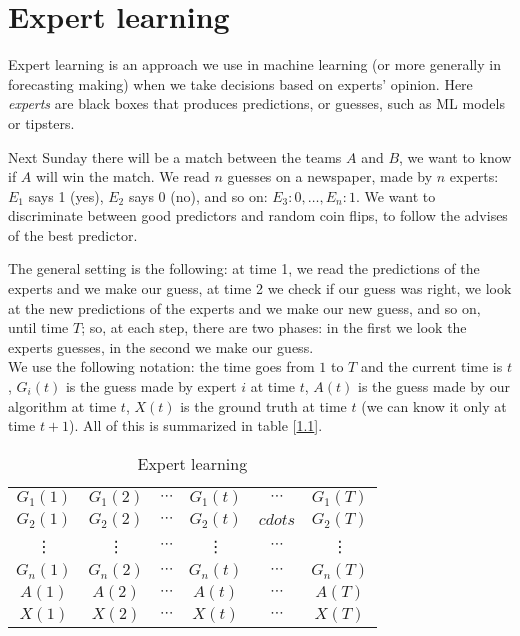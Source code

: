 \chapter{Expert learning}\label{sec:experts}

Expert learning is an approach we use in machine learning (or more generally in forecasting making) when we take decisions based on experts' opinion. Here \textit{experts} are black boxes that produces predictions, or guesses, such as ML models or tipsters.

\begin{ex}
    Next Sunday there will be a match between the teams $A$ and $B$, we want to know if $A$ will win the match. We read $n$ guesses on a newspaper, made by $n$ experts: $E_1$ says 1 (yes), $E_2$ says 0 (no), and so on: $E_3: 0, \ldots, E_n:1$. We want to discriminate between good predictors and random coin flips, to follow the advises of the best predictor.
\end{ex}

The general setting is the following: at time 1, we read the predictions of the experts and we make our guess, at time 2 we check if our guess was right, we look at the new predictions of the experts and we make our new guess, and so on, until time $T$; so, at each step, there are two phases: in the first we look the experts guesses, in the second we make our guess.\\
We use the following notation: the time goes from $1$ to $T$ and the current time is $t$, $G_i(t)$ is the guess made by expert $i$ at time $t$, $A(t)$ is the guess made by our algorithm at time $t$, $X(t)$ is the ground truth at time $t$ (we can know it only at time $t+1$). All of this is summarized in table [\ref{tab:experts}].
\begin{table}[h]
    \centering
    \begin{tabular}{|cccccc|}
        \hline
        $G_1(1)$ & $G_1(2)$ & $\cdots$ & $G_1(t)$ & $\cdots$ & $G_1(T)$ \\
        $G_2(1)$ & $G_2(2)$ & $\cdots$ & $G_2(t)$ & $cdots$ & $G_2(T)$ \\
        \vdots   & \vdots   & $\cdots$ & \vdots   & $\cdots$ & \vdots   \\
        $G_n(1)$ & $G_n(2)$ & $\cdots$ & $G_n(t)$ & $\cdots$ & $G_n(T)$ \\ \hline
        $A(1)$   & $A(2)$   & $\cdots$ & $A(t)$   & $\cdots$ & $A(T)$   \\ \hline
        $X(1)$   & $X(2)$   & $\cdots$ & $X(t)$   & $\cdots$ & $X(T)$   \\ \hline
    \end{tabular}
    \caption{Expert learning}
    \label{tab:experts}
\end{table}

